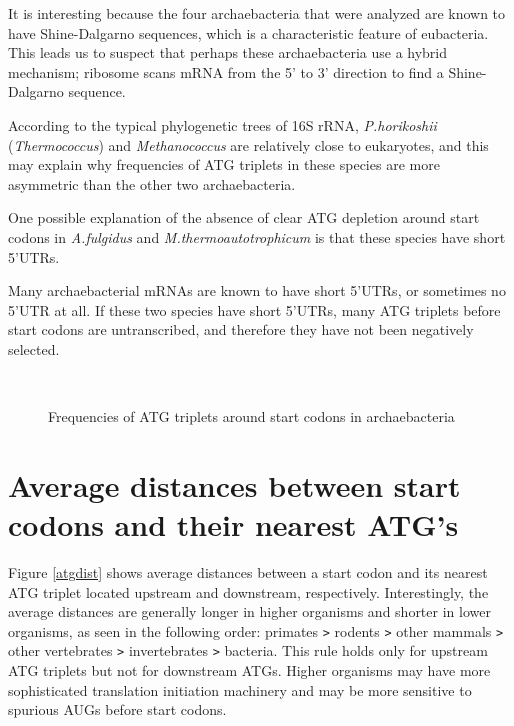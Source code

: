 It is interesting because the four archaebacteria that were analyzed
are known to have Shine-Dalgarno sequences, which is a characteristic
feature of eubacteria.  This leads us to suspect that perhaps these
archaebacteria use a hybrid mechanism; ribosome scans mRNA from the 5'
to 3' direction to find a Shine-Dalgarno sequence.

According to the typical phylogenetic trees of 16S rRNA\cite{label2095,label2099}, {\it P.horikoshii} ({\it Thermococcus}) and {\it
Methanococcus} are relatively close to eukaryotes, and this may
explain why frequencies of ATG triplets in these species are more
asymmetric than the other two archaebacteria.


One possible explanation of the absence of clear ATG depletion around
start codons in {\it A.fulgidus} and {\it M.thermoautotrophicum} is
that these species have short 5'UTRs.

Many archaebacterial mRNAs are known to have short 5'UTRs, or
sometimes no 5'UTR at all\cite{label3001,label2051}. If
these two species have short 5'UTRs, many ATG triplets before start
codons are untranscribed, and therefore they have not been negatively
selected.


\begin{figure}
\\
\caption{Frequencies of ATG triplets around start codons in
archaebacteria}
\label{archae_atg}
\end{figure}

\section{Average distances between start codons and their nearest ATG's}

Figure \ref{atgdist} shows average distances between a start codon and
its nearest ATG triplet located upstream and downstream, respectively.
Interestingly, the average distances are generally longer in higher
organisms and shorter in lower organisms, as seen in the following
order: primates \verb+>+ rodents \verb+>+ other mammals \verb+>+ other
vertebrates \verb+>+ invertebrates \verb+>+ bacteria.  This rule holds
only for upstream ATG triplets but not for downstream ATGs. Higher
organisms may have more sophisticated translation initiation machinery
and may be more sensitive to spurious AUGs before start codons.

